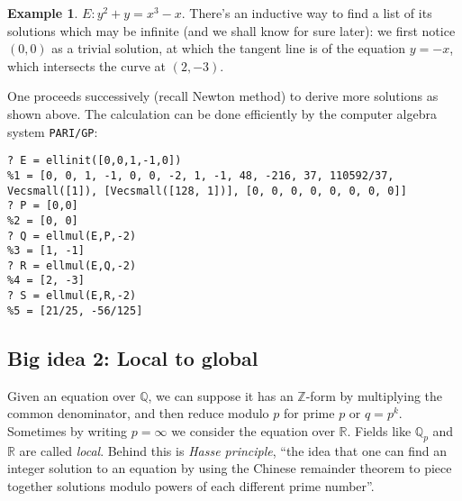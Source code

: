 \documentclass{article}
\newcommand{\Z}{\mathbb{Z}}
\newcommand{\Q}{\mathbb{Q}}
\newcommand{\R}{\mathbb{R}}
\theoremstyle{definition}
\newtheorem{example}[defn]{Example}
\begin{document}
\begin{example}
\label{example:CTP1stencounter}
$E:y^2+y=x^3-x$. There's an inductive way to find a list of its solutions which may be infinite (and we shall know for sure later): we first notice $(0,0)$ as a trivial solution, at which the tangent line is of the equation $y=-x$, which intersects the curve at $(2,-3)$.

\begin{center}
\end{center}

One proceeds successively (recall Newton method) to derive more solutions as shown above. The calculation can be done efficiently by the computer algebra system \texttt{PARI/GP}:

\begin{lstlisting}
? E = ellinit([0,0,1,-1,0])
%1 = [0, 0, 1, -1, 0, 0, -2, 1, -1, 48, -216, 37, 110592/37, Vecsmall([1]), [Vecsmall([128, 1])], [0, 0, 0, 0, 0, 0, 0, 0]]
? P = [0,0]
%2 = [0, 0]
? Q = ellmul(E,P,-2)
%3 = [1, -1]
? R = ellmul(E,Q,-2)
%4 = [2, -3]
? S = ellmul(E,R,-2)
%5 = [21/25, -56/125]
\end{lstlisting}
\end{example}

\subsection{Big idea 2: Local to global}
Given an equation over $\Q$, we can suppose it has an $\Z$-form by multiplying the common denominator, and then reduce modulo $p$ for prime $p$ or $q=p^k$. Sometimes by writing $p=\infty$ we consider the equation over $\R$. Fields like $\Q_p$ and $\R$ are called \textit{local}. Behind this is \textit{Hasse principle}, ``the idea that one can find an integer solution to an equation by using the Chinese remainder theorem to piece together solutions modulo powers of each different prime number''.
\end{document}

